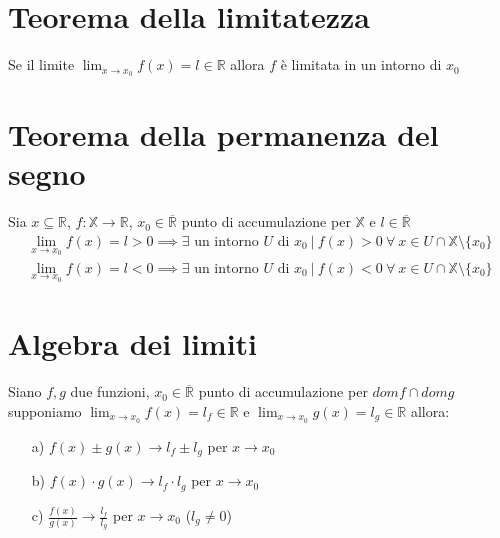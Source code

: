 \section{Teorema della limitatezza}
Se il limite $\displaystyle \lim_{x \to x_0}f(x) = l \in \mathbb{R}$ allora $f$ è limitata in un intorno di $x_0$
\section{Teorema della permanenza del segno}
Sia $x \subseteq \mathbb{R}$, $f:\mathbb{X} \rightarrow \mathbb{R}$, $x_0 \in \overline{\mathbb{R}}$ punto di accumulazione per $\mathbb{X}$ e $l \in \overline{\mathbb{R}}$
\begin{equation}
\begin{split}
\displaystyle \lim_{x \to x_0}f(x) = l > 0 \implies \exists \text{ un intorno } U \text{ di } x_0\ |\ f(x)>0\ \forall\ x \in U \cap \mathbb{X} \setminus \{x_0\} \\
\lim_{x \to x_0}f(x) = l < 0 \implies \exists \text{ un intorno } U \text{ di } x_0\ |\ f(x)<0\ \forall\ x \in U \cap \mathbb{X} \setminus \{x_0\}
\end{split}
\end{equation}
\section{Algebra dei limiti}
Siano $f, g$ due funzioni, $x_0 \in \overline{\mathbb{R}}$ punto di accumulazione per $domf \cap domg$
supponiamo $\displaystyle \lim_{x \to x_0}f(x) = l_f \in \mathbb{R}$ e $\displaystyle \lim_{x \to x_0}g(x) = l_g \in \mathbb{R}$ allora:
\begin{enumerate}
\item[a)]$f(x)\pm g(x) \rightarrow l_f \pm l_g$ per $x \to x_0$
\item[b)]$f(x)\cdot g(x) \rightarrow l_f \cdot l_g$ per $x \to x_0$
\item[c)]$\frac{f(x)}{g(x)} \rightarrow \frac{l_f}{l_g}$ per $x \to x_0$ ($l_g \neq 0$)
\end{enumerate}
